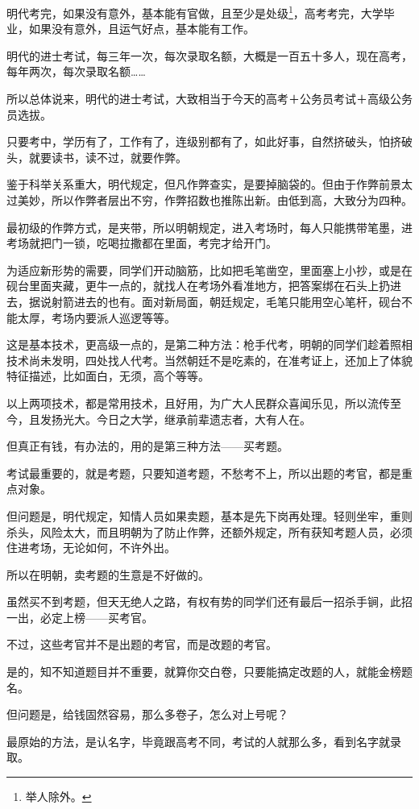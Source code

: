 \begin{multicols}{\theparacolNo}
		明代考完，如果没有意外，基本能有官做，且至少是处级\footnote{举人除外。}，高考考完，大学毕业，如果没有意外，且运气好点，基本能有工作。

		明代的进士考试，每三年一次，每次录取名额，大概是一百五十多人，现在高考，每年两次，每次录取名额……

		所以总体说来，明代的进士考试，大致相当于今天的高考＋公务员考试＋高级公务员选拔。

		只要考中，学历有了，工作有了，连级别都有了，如此好事，自然挤破头，怕挤破头，就要读书，读不过，就要作弊。

		鉴于科举关系重大，明代规定，但凡作弊查实，是要掉脑袋的。但由于作弊前景太过美妙，所以作弊者层出不穷，作弊招数也推陈出新。由低到高，大致分为四种。

		最初级的作弊方式，是夹带，所以明朝规定，进入考场时，每人只能携带笔墨，进考场就把门一锁，吃喝拉撒都在里面，考完才给开门。

		为适应新形势的需要，同学们开动脑筋，比如把毛笔凿空，里面塞上小抄，或是在砚台里面夹藏，更牛一点的，就找人在考场外看准地方，把答案绑在石头上扔进去，据说射箭进去的也有。面对新局面，朝廷规定，毛笔只能用空心笔杆，砚台不能太厚，考场内要派人巡逻等等。

		这是基本技术，更高级一点的，是第二种方法：枪手代考，明朝的同学们趁着照相技术尚未发明，四处找人代考。当然朝廷不是吃素的，在准考证上，还加上了体貌特征描述，比如面白，无须，高个等等。

		以上两项技术，都是常用技术，且好用，为广大人民群众喜闻乐见，所以流传至今，且发扬光大。今日之大学，继承前辈遗志者，大有人在。

		但真正有钱，有办法的，用的是第三种方法——买考题。

		考试最重要的，就是考题，只要知道考题，不愁考不上，所以出题的考官，都是重点对象。

		但问题是，明代规定，知情人员如果卖题，基本是先下岗再处理。轻则坐牢，重则杀头，风险太大，而且明朝为了防止作弊，还额外规定，所有获知考题人员，必须住进考场，无论如何，不许外出。

		所以在明朝，卖考题的生意是不好做的。

		虽然买不到考题，但天无绝人之路，有权有势的同学们还有最后一招杀手锏，此招一出，必定上榜——买考官。

		不过，这些考官并不是出题的考官，而是改题的考官。

		是的，知不知道题目并不重要，就算你交白卷，只要能搞定改题的人，就能金榜题名。

		但问题是，给钱固然容易，那么多卷子，怎么对上号呢？

		最原始的方法，是认名字，毕竟跟高考不同，考试的人就那么多，看到名字就录取。


\end{multicols}
